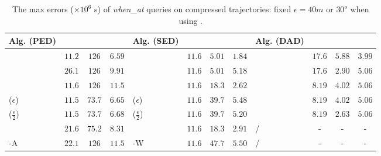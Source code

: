{\begin{table}
	\caption{\small {The max errors {($\times 10^6$ s)} of \emph{when\_at} queries on compressed trajectories: fixed $\epsilon=40m$ or $30^o$ when using \dad.}}
	\centering
	\scriptsize
	\vspace{-1ex}
	\begin{tabular}{|l|c|c|c|l|c|c|c|l|c|c|c|}
		\hline
		\bf{Alg. (PED)}  &\ucar &\geolife &\mopsi & \bf{Alg. (SED)}  &\ucar &\geolife &\mopsi &\bf{Alg. (DAD)}  &\ucar &\geolife &\mopsi \\
		\hline
		{\dpa} &	$11.2$ & $126$ &	$6.59  $	&\dpa &$11.6  $ &$5.01  $ & $1.84 $ & \dpa	& $17.6 $	& $5.88 $	& $3.99 $ \\
		\hline
		{\tpa} &	$26.1$ & $126  $ &	$9.91  $	&\tpa 	& $11.6  $& $5.01  $ &$5.18 $ & \tpa	& $ 17.6 $	& $ 2.90 $	& $ 5.06  $ \\
		\hline
		{\bqsa} &	$11.6$ & $126 $ &	$ 11.5 $	&\squishe &$11.6  $ & $ 18.3  $ & $2.62 $ & \opwa	& $8.19 $	& $ 4.02$	& $5.06 $ \\
		\hline
		{\siped($\epsilon$)} &	$11.5$ & $73.7  $ &	$6.65  $	&\cised($\epsilon$) & $ 11.6 $ &$ 39.7	  $ &$5.48 $ & \interval& $8.19 $	& $4.02 $	& $ 5.06 $ \\
		\hline
		{\siped($\frac{\epsilon}{2}$)} &	$11.5$ & $73.7 $ &	$ 6.68 $ &\cised($\frac{\epsilon}{2}$) &$ 11.6 $ & {$39.7$} & $5.20 $& \intersec	& $ 8.19 $	& $ 2.63 $	& $ 5.06 $ \\
		\hline
		{\operb} &	$21.6 $ & $75.2 $ & $8.31 $	& {\dagots} &$11.6$ &$18.3$ & $2.91$ & /&- &- &- \\
		\hline
		{\operb-A} &	${22.1} $ & ${126} $ & ${11.5} $	&  {\cised-W} &$11.6$ &$47.7$ &$5.50$ & / &- &- &- \\
		\hline
	\end{tabular}
	\label{tab:query-when-me}
	\vspace{-1ex}
\end{table}






}
